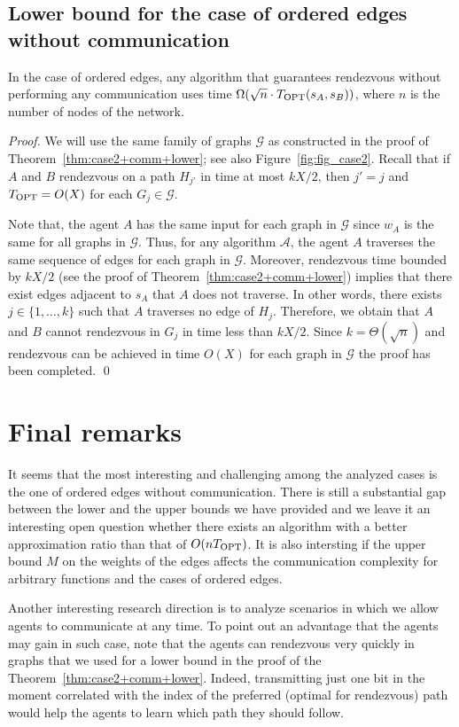 \documentclass{llncs}
\newcommand{\Topt}[2]{T_{{\scriptsize \textup{OPT}}}(#1,#2)}
\newcommand{\Topts}{T_{\scriptsize \textup{OPT}}}
\newcommand{\startpos}[1]{s_{#1}}
\newcommand{\starta}{\startpos{A}}
\newcommand{\startb}{\startpos{B}}
\newcommand{\cG}{\mathcal{G}}
\newcommand{\cA}{\mathcal{A}}
\begin{document}
\subsection{Lower bound for the case of ordered edges without communication}


\begin{theorem} \label{thm:case2+no-comm}
In the case of ordered edges, any algorithm that guarantees rendezvous without performing any communication uses time $\Omega(\sqrt{n}\cdot\Topt{\starta}{\startb})$, where $n$ is the number of nodes of the network.
\end{theorem}
\begin{proof}
We will use the same family of graphs $\cG$ as constructed in the proof of Theorem~\ref{thm:case2+comm+lower}; see also Figure~\ref{fig:fig_case2}.
Recall that if $A$ and $B$ rendezvous on a path $H_{j'}$ in time at most $kX/2$, then $j'=j$ and
$\Topts = O(X)$ for each $G_j\in\cG$.

\smallskip
Note that, the agent $A$ has the same input for each graph in $\cG$ since $w_A$ is the same for all graphs in $\cG$.
Thus, for any algorithm $\cA$, the agent $A$ traverses the same sequence of edges for each graph in $\cG$.
Moreover, rendezvous time bounded by $kX/2$ (see the proof of Theorem~\ref{thm:case2+comm+lower}) implies that there exist edges adjacent to $\starta$ that $A$ does not traverse.
In other words, there exists $j\in\{1,\ldots,k\}$ such that $A$ traverses no edge of $H_j$.
Therefore, we obtain that $A$ and $B$ cannot rendezvous in $G_j$ in time less than $kX/2$.
Since $k=\Theta(\sqrt{n})$ and rendezvous can be achieved in time $O(X)$ for each graph in $\cG$ the proof has been completed.
\qed\end{proof}

\section{Final remarks}
It seems that the most interesting and challenging among the analyzed cases is the one of ordered edges without communication.
There is still a substantial gap between the lower and the upper bounds we have provided and we leave it an interesting open question whether there exists an algorithm with a better approximation ratio than that of $O(n\Topts)$.
It is also intersting if the upper bound $M$ on the weights of the edges affects the communication complexity
for arbitrary functions and the cases of ordered edges.

Another interesting research direction is to analyze scenarios in which we allow agents to communicate at any time. 
To point out an advantage that the agents may gain in such case, note that the agents can rendezvous very quickly in graphs that we used for a lower bound in the proof of the Theorem~\ref{thm:case2+comm+lower}.
Indeed, transmitting just one bit in the moment correlated with the index of the preferred (optimal for rendezvous) path would help the agents to learn which path they should follow.
\end{document}
